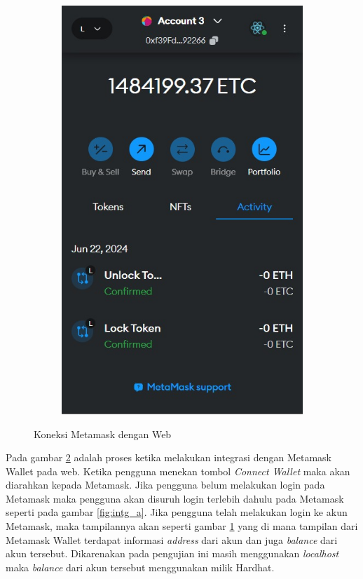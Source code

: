 \begin{figure} [H]
\begin{subfigure}{0.45\textwidth}
    \includegraphics[scale=0.35]{gambar/metamask_konek.jpeg}
    \caption{}
    \label{fig:intg_b}
\end{subfigure}
  \caption{Koneksi Metamask dengan Web}
  \label{fig:koneksi_web_metamask}
  \end{figure}

  Pada gambar \ref{fig:koneksi_web_metamask} adalah proses ketika melakukan integrasi dengan Metamask Wallet pada web. Ketika pengguna menekan tombol \emph{Connect Wallet} maka akan diarahkan kepada Metamask. Jika pengguna belum melakukan login pada Metamask maka pengguna akan disuruh login terlebih dahulu pada Metamask seperti pada gambar \ref{fig:intg_a}. Jika pengguna telah melakukan login ke akun Metamask, maka tampilannya akan seperti gambar \ref{fig:intg_b} yang di mana tampilan dari Metamask Wallet terdapat informasi \emph{address} dari akun dan juga \emph{balance} dari akun tersebut. Dikarenakan pada pengujian ini masih menggunakan \emph{localhost} maka \emph{balance} dari akun tersebut menggunakan milik Hardhat.
    

